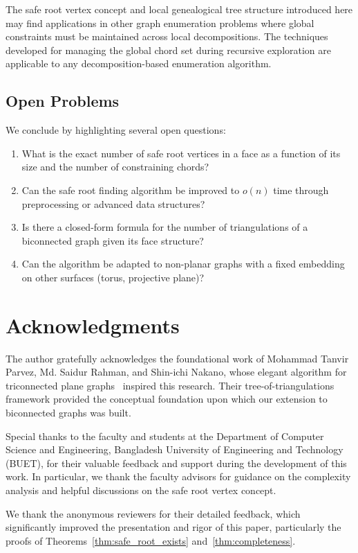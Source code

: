 \documentclass[12pt,a4paper]{article}
\theoremstyle{definition}
\theoremstyle{remark}
\begin{document}
The safe root vertex concept and local genealogical tree structure introduced here may find applications in other graph enumeration problems where global constraints must be maintained across local decompositions. The techniques developed for managing the global chord set during recursive exploration are applicable to any decomposition-based enumeration algorithm.

\subsection{Open Problems}

We conclude by highlighting several open questions:

\begin{enumerate}
    \item What is the exact number of safe root vertices in a face as a function of its size and the number of constraining chords?
    \item Can the safe root finding algorithm be improved to $o(n)$ time through preprocessing or advanced data structures?
    \item Is there a closed-form formula for the number of triangulations of a biconnected graph given its face structure?
    \item Can the algorithm be adapted to non-planar graphs with a fixed embedding on other surfaces (torus, projective plane)?
\end{enumerate}

\section*{Acknowledgments}

The author gratefully acknowledges the foundational work of Mohammad Tanvir Parvez, Md. Saidur Rahman, and Shin-ichi Nakano, whose elegant algorithm for triconnected plane graphs~\cite{parvez2011} inspired this research. Their tree-of-triangulations framework provided the conceptual foundation upon which our extension to biconnected graphs was built.

Special thanks to the faculty and students at the Department of Computer Science and Engineering, Bangladesh University of Engineering and Technology (BUET), for their valuable feedback and support during the development of this work. In particular, we thank the faculty advisors for guidance on the complexity analysis and helpful discussions on the safe root vertex concept.

We thank the anonymous reviewers for their detailed feedback, which significantly improved the presentation and rigor of this paper, particularly the proofs of Theorems~\ref{thm:safe_root_exists} and~\ref{thm:completeness}.
\end{document}
